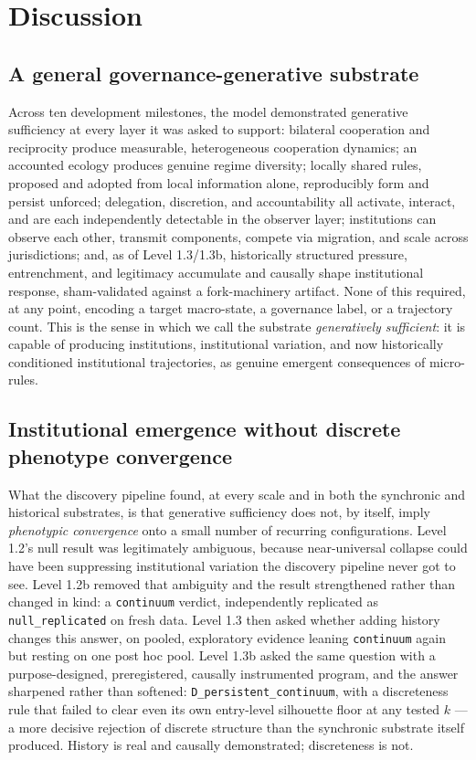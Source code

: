 \section{Discussion}
\label{sec:discussion}

\subsection{A general governance-generative substrate}
\label{sec:disc-substrate}

Across ten development milestones, the model demonstrated generative
sufficiency at every layer it was asked to support: bilateral cooperation
and reciprocity produce measurable, heterogeneous cooperation dynamics; an
accounted ecology produces genuine regime diversity; locally shared rules,
proposed and adopted from local information alone, reproducibly form and
persist unforced; delegation, discretion, and accountability all activate,
interact, and are each independently detectable in the observer layer;
institutions can observe each other, transmit components, compete via
migration, and scale across jurisdictions; and, as of Level 1.3/1.3b,
historically structured pressure, entrenchment, and legitimacy accumulate
and causally shape institutional response, sham-validated against a
fork-machinery artifact. None of this required, at any point, encoding a
target macro-state, a governance label, or a trajectory count. This is the
sense in which we call the substrate \textit{generatively sufficient}: it
is capable of producing institutions, institutional variation, and now
historically conditioned institutional trajectories, as genuine emergent
consequences of micro-rules.

\subsection{Institutional emergence without discrete phenotype convergence}
\label{sec:disc-emergence-without-convergence}

What the discovery pipeline found, at every scale and in both the
synchronic and historical substrates, is that generative sufficiency does
not, by itself, imply \textit{phenotypic convergence} onto a small number
of recurring configurations. Level 1.2's null result was legitimately
ambiguous, because near-universal collapse could have been suppressing
institutional variation the discovery pipeline never got to see. Level
1.2b removed that ambiguity and the result strengthened rather than
changed in kind: a \texttt{continuum} verdict, independently replicated as
\texttt{null\_replicated} on fresh data. Level 1.3 then asked whether
adding history changes this answer, on pooled, exploratory evidence
leaning \texttt{continuum} again but resting on one post hoc pool. Level
1.3b asked the same question with a purpose-designed, preregistered,
causally instrumented program, and the answer sharpened rather than
softened: \texttt{D\_persistent\_continuum}, with a discreteness rule that
failed to clear even its own entry-level silhouette floor at any tested
$k$ --- a more decisive rejection of discrete structure than the
synchronic substrate itself produced. History is real and causally
demonstrated; discreteness is not.

